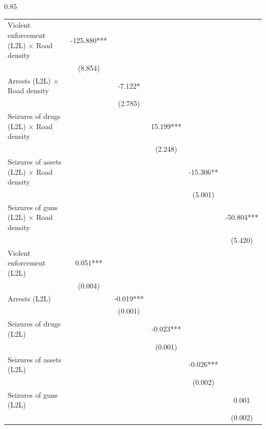 \documentclass[12pt,letterpaper]{article}
\begin{document}
\begin{landscape}
\begin{center}
\begin{spacing}{0.85}
\begin{longtable}{lccccc}
Violent enforcement (L2L) $\times$ Road density & -125.880*** &   &   &   &   \\
 & (8.854)  &   &   &   &   \\
Arrests (L2L) $\times$ Road density &   & -7.122* &   &   &   \\
 &   & (2.785)  &   &   &   \\
Seizures of drugs (L2L) $\times$ Road density &   &   & 15.199*** &   &   \\
 &   &   & (2.248)  &   &   \\
Seizures of assets (L2L) $\times$ Road density &   &   &   & -15.306** &   \\
 &   &   &   & (5.001)  &   \\
Seizures of guns (L2L) $\times$ Road density &   &   &   &   & -50.804*** \\
 &   &   &   &   & (5.420)  \\
                
Violent enforcement (L2L)  & 0.051*** &   &   &   &   \\
 & (0.004)  &   &   &   &   \\
Arrests (L2L)  &   & -0.019*** &   &   &   \\
 &   & (0.001)  &   &   &   \\
Seizures of drugs (L2L)  &   &   & -0.023*** &   &   \\
 &   &   & (0.001)  &   &   \\
Seizures of assets (L2L) &   &   &   & -0.026*** &   \\
 &   &   &   & (0.002)  &   \\
Seizures of guns (L2L)  &   &   &   &   & 0.001  \\
 &   &   &   &   & (0.002)  \\
                

\end{longtable}
\end{spacing}
\end{center}
\end{landscape}
\end{document}
